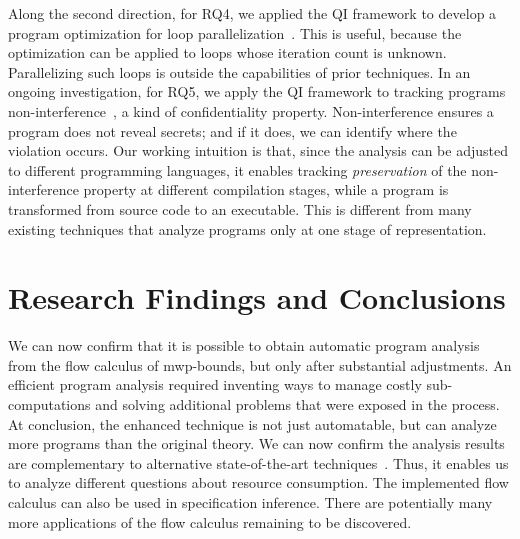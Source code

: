 Along the second direction, for RQ4, we applied the QI framework to develop a
program optimization for loop parallelization~\cite{aubert20232}. This is
useful, because the optimization can be applied to loops whose iteration count
is unknown. Parallelizing such loops is outside the capabilities of prior
techniques. In an ongoing investigation, for RQ5, we apply the QI framework to
tracking programs {non\hyp{}interference}~\cite{goguen1982}, a kind of
confidentiality property. Non-interference ensures a
program does not reveal secrets; and if it does, we can identify where the
violation occurs. Our working intuition is that, since the analysis can be
adjusted to different programming languages, it enables tracking
\emph{preservation} of the non-interference property at different compilation
stages, while a program is transformed from source code to an executable. This
is different from many existing techniques that analyze programs only at one
stage of representation.

\section{Research Findings and Conclusions}
\label{sec:aicc-discussion}

 We can now confirm that it is possible to obtain automatic program
analysis from the flow calculus of mwp-bounds, but only after substantial
adjustments. An efficient program analysis required inventing ways to manage
costly sub-computations and solving additional problems that were exposed in the
process. At conclusion, the enhanced technique is not just automatable, but can
analyze more programs than the original theory. We can now confirm the analysis
results are complementary to alternative state-of-the-art techniques~\cite[p.
5]{aubert2023b}. Thus, it enables us to analyze different questions about
resource consumption. The implemented flow calculus can also be used in
specification inference. There are potentially many more
applications of the flow calculus remaining to be discovered.

